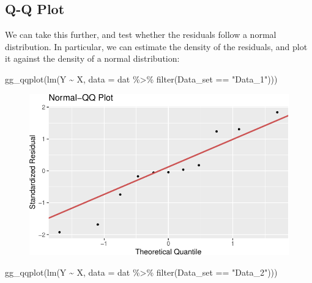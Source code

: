 \documentclass[
  letterpaper,
  DIV=11,
  numbers=noendperiod]{scrreprt}
\newenvironment{Shaded}{\begin{snugshade}}{\end{snugshade}}
\newcommand{\AttributeTok}[1]{\textcolor[rgb]{0.40,0.45,0.13}{#1}}
\newcommand{\FunctionTok}[1]{\textcolor[rgb]{0.28,0.35,0.67}{#1}}
\newcommand{\NormalTok}[1]{\textcolor[rgb]{0.00,0.23,0.31}{#1}}
\newcommand{\SpecialCharTok}[1]{\textcolor[rgb]{0.37,0.37,0.37}{#1}}
\newcommand{\StringTok}[1]{\textcolor[rgb]{0.13,0.47,0.30}{#1}}
\begin{document}
\hypertarget{q-q-plot}{%
\subsection{Q-Q Plot}\label{q-q-plot}}

We can take this further, and test whether the residuals follow a normal
distribution. In particular, we can estimate the density of the
residuals, and plot it against the density of a normal distribution:

\begin{Shaded}
\begin{Highlighting}[]
\FunctionTok{gg\_qqplot}\NormalTok{(}\FunctionTok{lm}\NormalTok{(Y }\SpecialCharTok{\textasciitilde{}}\NormalTok{ X, }\AttributeTok{data =}\NormalTok{ dat }\SpecialCharTok{\%\textgreater{}\%} \FunctionTok{filter}\NormalTok{(Data\_set }\SpecialCharTok{==} \StringTok{"Data\_1"}\NormalTok{)))}
\end{Highlighting}
\end{Shaded}

\begin{figure}[H]

{\centering \includegraphics{./08-linearreg_files/figure-pdf/unnamed-chunk-27-1.pdf}

}

\end{figure}

\begin{Shaded}
\begin{Highlighting}[]
\FunctionTok{gg\_qqplot}\NormalTok{(}\FunctionTok{lm}\NormalTok{(Y }\SpecialCharTok{\textasciitilde{}}\NormalTok{ X, }\AttributeTok{data =}\NormalTok{ dat }\SpecialCharTok{\%\textgreater{}\%} \FunctionTok{filter}\NormalTok{(Data\_set }\SpecialCharTok{==} \StringTok{"Data\_2"}\NormalTok{)))}
\end{Highlighting}
\end{Shaded}
\end{document}
